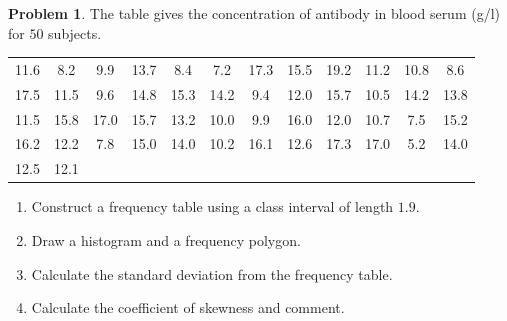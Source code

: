 \documentclass[11pt,a4paper]{article}
\theoremstyle{definition}
\newtheorem{problemx}{Problem}[section]
\newenvironment{problem}{\begin{problemx}}{\end{problemx}}
\begin{document}
\begin{problem}
The table gives the concentration of antibody in blood serum (g/l) for $50$ subjects.
\begin{table}[H]
\centering
\begin{tabular}{cccccccccccc}
11.6 & 8.2 & 9.9 & 13.7 & 8.4 & 7.2 & 17.3 & 15.5 & 19.2 & 11.2 & 10.8 & 8.6\\
17.5 & 11.5 & 9.6 & 14.8 & 15.3 & 14.2 & 9.4 & 12.0 & 15.7 & 10.5 & 14.2 & 13.8\\
11.5 & 15.8 & 17.0 & 15.7 & 13.2 & 10.0 & 9.9 & 16.0 & 12.0 & 10.7 & 7.5 & 15.2\\
16.2 & 12.2 & 7.8 & 15.0 & 14.0 & 10.2 & 16.1 & 12.6 & 17.3 & 17.0 & 5.2 & 14.0\\
12.5 & 12.1 & & & & & & & & & &\\
\end{tabular}
\end{table}
\begin{enumerate}
\item[(a).] Construct a frequency table using a class interval of length $1.9$.
\item[(b).] Draw a histogram and a frequency polygon.
\item[(c).] Calculate the standard deviation from the frequency table.
\item[(d).] Calculate the coefficient of skewness and comment.
\end{enumerate}
\end{problem}
\end{document}
